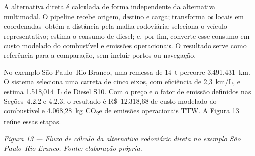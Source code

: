 \documentclass[brazil,]{article}
\begin{document}
A alternativa direta é calculada de forma independente da alternativa
multimodal. O pipeline recebe origem, destino e carga; transforma os
locais em coordenadas; obtém a distância pela malha rodoviária;
seleciona o veículo representativo; estima o consumo de diesel; e, por
fim, converte esse consumo em custo modelado do combustível e emissões
operacionais. O resultado serve como referência para a comparação, sem
incluir portos ou navegação.

No exemplo São Paulo--Rio Branco, uma remessa de 14~t percorre
3.491,431~km. O sistema seleciona uma carreta de cinco eixos, com
eficiência de 2,3~km/L, e estima 1.518,014~L de Diesel S10. Com o preço
e o fator de emissão definidos nas Seções~4.2.2 e 4.2.3, o resultado é
R\$~12.318,68 de custo modelado do combustível e 4.068,28~kg~CO\textsubscript{2}e de
emissões operacionais TTW. A Figura 13 reúne essas etapas.

\begin{center}
\end{center}

\emph{Figura 13 --- Fluxo de cálculo da alternativa rodoviária direta no
exemplo São Paulo--Rio Branco. Fonte: elaboração própria.}
\end{document}
